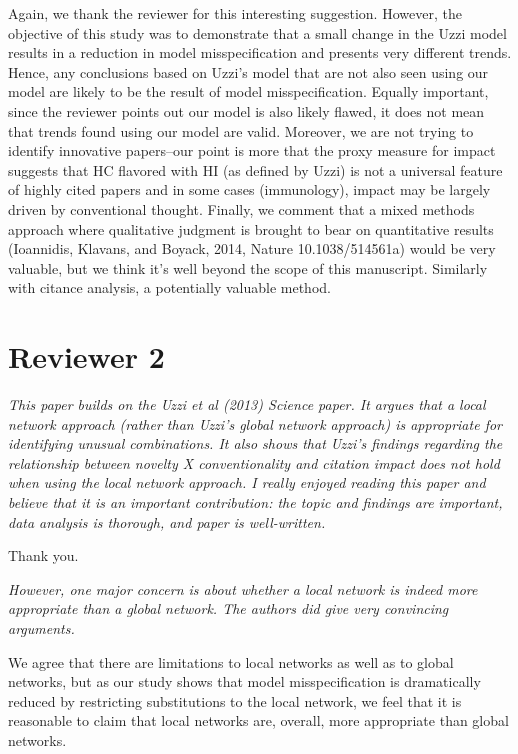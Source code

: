 \documentclass[11pt, oneside]{article}   	%
\begin{document}
Again, we thank the reviewer for this interesting suggestion. However, the objective of this study was to demonstrate that a small change in the  Uzzi model results in a reduction in model misspecification and presents very different trends. Hence, any conclusions based on Uzzi's model that are not also seen  using our model are likely to be the result of  model misspecification. Equally important, since the reviewer points out our model is also likely flawed, it does not mean that trends found using our model are valid. Moreover, we are not trying to identify innovative papers--our point is more that the proxy measure for impact suggests that HC flavored with HI (as defined by Uzzi) is not a universal feature of highly cited papers and in some cases (immunology), impact may be largely driven by conventional thought. Finally, we comment that a mixed methods approach where qualitative judgment is brought to bear on quantitative results (Ioannidis, Klavans, and Boyack, 2014, Nature 10.1038/514561a) would be very valuable, but we think it's well beyond the scope of this manuscript. Similarly with citance analysis, a potentially valuable method.

\section{Reviewer 2}

\emph{This paper builds on the Uzzi et al (2013) Science paper.  It argues that a local network approach (rather than Uzzi's global network approach) is appropriate for identifying unusual combinations.  It also shows that Uzzi's findings regarding the relationship between novelty X conventionality and citation impact does not hold when using the local network approach. I really enjoyed reading this paper and believe that it is an important contribution: the topic and findings are important, data analysis is thorough, and paper is well-written.}

Thank you. 
 
\emph{However, one major concern is about whether a local network is indeed more appropriate than a global network.  The authors did give very convincing arguments. }

We agree that there are limitations to local networks as well as to global networks, but as our study shows that model misspecification is dramatically reduced by restricting substitutions to the local network, we feel that it is reasonable to claim that local networks are, overall, more appropriate
than global networks.
\end{document}
